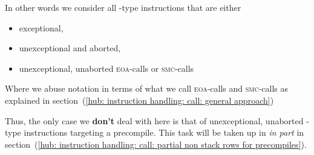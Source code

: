 	\begin{center}
	\end{center}
In other words we consider all -type instructions that are either
\begin{itemize}
	\item exceptional,
	\item unexceptional and aborted,
	\item unexceptional, unaborted \textsc{eoa}-calls or \textsc{smc}-calls
\end{itemize}
Where we abuse notation in terms of what we call
\textsc{eoa}-calls and \textsc{smc}-calls as explained in
section~(\ref{hub: instruction handling: call: general approach})

Thus, the only case we \textbf{don't} deal with here is that of
unexceptional, unaborted -type instructions targeting a precompile.
This task will be taken up in \emph{in part} in
section~(\ref{hub: instruction handling: call: partial non stack rows for precompiles}).

